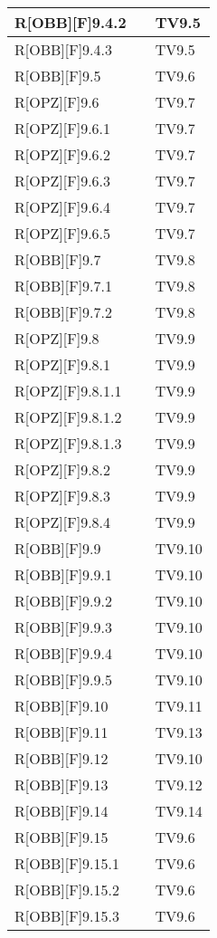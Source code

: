	
	\begin{table}[h]
		\begin{tabular}{|p{}|p{}|p{}|}
			\midrule
						
			R[OBB][F]9.4.2 &  & TV9.5 \\ \midrule
			R[OBB][F]9.4.3 &  & TV9.5 \\ \midrule
			R[OBB][F]9.5 &  & TV9.6 \\ \midrule
			R[OPZ][F]9.6 &  & TV9.7 \\ \midrule
			R[OPZ][F]9.6.1 &  & TV9.7 \\ \midrule
			R[OPZ][F]9.6.2 &  & TV9.7 \\ \midrule
			R[OPZ][F]9.6.3 &  & TV9.7 \\ \midrule
			R[OPZ][F]9.6.4 &  & TV9.7 \\ \midrule
			R[OPZ][F]9.6.5 &  & TV9.7 \\ \midrule
			R[OBB][F]9.7 &  & TV9.8 \\ \midrule
			R[OBB][F]9.7.1 &  & TV9.8 \\ \midrule
			R[OBB][F]9.7.2 &  & TV9.8 \\ \midrule
			R[OPZ][F]9.8 & & TV9.9 \\ \midrule
			R[OPZ][F]9.8.1 &  & TV9.9 \\ \midrule
			R[OPZ][F]9.8.1.1 &  & TV9.9 \\ \midrule
			R[OPZ][F]9.8.1.2 &  & TV9.9 \\ \midrule
			R[OPZ][F]9.8.1.3 &  & TV9.9 \\ \midrule
			R[OPZ][F]9.8.2 &  & TV9.9 \\ \midrule
			R[OPZ][F]9.8.3 &  & TV9.9 \\ \midrule
			R[OPZ][F]9.8.4 &  & TV9.9 \\ \midrule
			R[OBB][F]9.9 &  & TV9.10 \\ \midrule
			R[OBB][F]9.9.1 &  & TV9.10 \\ \midrule
			R[OBB][F]9.9.2 &  & TV9.10 \\ \midrule
			R[OBB][F]9.9.3 &  & TV9.10 \\ \midrule
			R[OBB][F]9.9.4 &  & TV9.10 \\ \midrule
			R[OBB][F]9.9.5 &  & TV9.10 \\ \midrule
			R[OBB][F]9.10 &  & TV9.11 \\ \midrule
			R[OBB][F]9.11 &  & TV9.13 \\ \midrule
			R[OBB][F]9.12 &  & TV9.10 \\ \midrule
			R[OBB][F]9.13 &  & TV9.12 \\ \midrule
			R[OBB][F]9.14 &  & TV9.14 \\ \midrule
			R[OBB][F]9.15 &  & TV9.6 \\ \midrule
			R[OBB][F]9.15.1 &  & TV9.6 \\ \midrule
			R[OBB][F]9.15.2 &  & TV9.6 \\ \midrule
			R[OBB][F]9.15.3 &  & TV9.6 \\ \midrule

		\end{tabular}
	\end{table}
	\newpage
	
